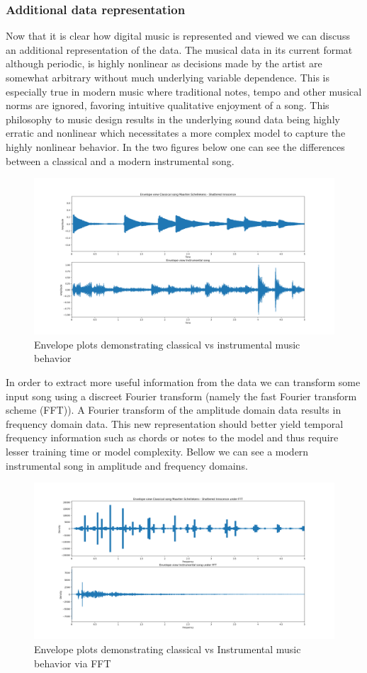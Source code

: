 \documentclass{article}
\begin{document}
\subsubsection{Additional data representation}
Now that it is clear how digital music is represented and viewed we can discuss an additional representation of the data. The musical data in its current format although periodic, is highly nonlinear as decisions made by the artist are somewhat arbitrary without much underlying variable dependence. This is especially true in modern music where traditional notes, tempo and other musical norms are ignored, favoring intuitive qualitative enjoyment of a song. This philosophy to music design results in the underlying sound data being highly erratic and nonlinear which necessitates a more complex model to capture the highly nonlinear behavior. In the two figures below one can see the differences between a classical and a modern instrumental song.
\begin{figure}[H]
\caption{Envelope plots demonstrating classical vs instrumental music behavior}
\includegraphics[scale=0.35]{Classical_vs_Instrumental.png}
\end{figure}
In order to extract more useful information from the data we can transform some input song using a discreet Fourier transform (namely the fast Fourier transform scheme (FFT)). A Fourier transform of the amplitude domain data results in frequency domain data. This new representation should better yield temporal frequency information such as chords or notes to the model and thus require lesser training time or model complexity. Bellow we can see a modern instrumental song in amplitude and frequency domains. 
\begin{figure}[H]
\caption{Envelope plots demonstrating classical vs Instrumental music behavior via FFT}
\includegraphics[scale=0.35]{Classical_vs_InstrumentalFFT.png}
\end{figure}
\end{document}
